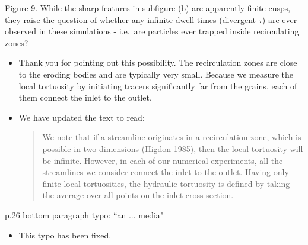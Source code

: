 \documentclass[11pt]{article}
\newcommand{\comment}[1]{{\color{blue} #1}}
\begin{document}
\noindent
\comment{Figure 9.  While the sharp features in subfigure (b) are
apparently finite cusps, they raise the question of whether any infinite
dwell times (divergent $\tau$) are ever observed in these simulations -
i.e.~are particles ever trapped inside recirculating zones?}
\begin{itemize}
  \item Thank you for pointing out this possibility. The
    recirculation zones are close to the eroding bodies and are
    typically very small. Because we measure the local tortuosity by
    initiating tracers significantly far from the grains, each of them
    connect the inlet to the outlet.

  \item We have updated the text to read:
    \begin{quotation}
      \noindent
      We note that if a streamline originates in a recirculation zone,
      which is possible in two dimensions (Higdon 1985), then the local
      tortuosity will be infinite. However, in each of our numerical
      experiments, all the streamlines we consider connect the inlet to
      the outlet.  Having only finite local tortuosities, the hydraulic
      tortuosity is defined by taking the average over all points on the
      inlet cross-section.
    \end{quotation}
\end{itemize}

\noindent
\comment{p.26 bottom paragraph typo: ``an ... media"}
\begin{itemize}
  \item This typo has been fixed.
\end{itemize}
\end{document}
